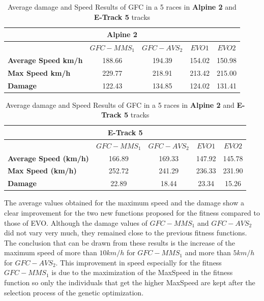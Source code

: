 \documentclass[conference]{IEEEtran}
\begin{document}
\begin{table}[!ht]
  \centering
  {\scriptsize
    \caption{Average damage and Speed Results of GFC in a 5 races in \textbf{Alpine 2} and  \textbf{E-Track 5} tracks}
    \label{tab:damagespeed}
    \begin{tabular}{|p{1.65cm}|c|c|c|c|}
      \hline 
      \multicolumn{5}{|c|}{\textbf{Alpine 2}}  \\	
      \hline  
   & \textbf{$GFC-MMS_1$}&\textbf{$GFC-AVS_2$} & \textbf{$EVO1$} &\textbf{$EVO2$}\\					
      \hline \textbf{Average Speed km/h}& 188.66&194.39&154.02&150.98\\
      \hline \textbf{Max Speed km/h}& 229.77&218.91&213.42&215.00\\	
      \hline \textbf{Damage}& 122.43& 134.85&124.02 &131.41\\	
      \hline 
    \end{tabular}
    \begin{tabular}{|p{1.65cm}|c|c|c|c|}
      \multicolumn{5}{|c|}{\textbf{E-Track 5}}  \\
      \hline 
   & \textbf{$GFC-MMS_1$}&\textbf{$GFC-AVS_2$} & \textbf{$EVO1$} &\textbf{$EVO2$} \\				
      \hline \textbf{Average Speed (km/h)}& 166.89&169.33&147.92&145.78\\
      \hline \textbf{Max Speed  (km/h)}&252.72&241.29&236.33&231.90\\	
      \hline \textbf{Damage}& 22.89& 18.44&23.34 &15.26\\	
      \hline 
    \end{tabular}
	}
\end{table} 

The average values obtained for the maximum speed and the damage show a clear improvement for the two new functions proposed for the fitness compared to those of EVO.
Although the damage values of $GFC-MMS_1$ and $GFC-AVS_2$ did not vary very much, they remained close to the previous fitness functions.
The conclusion that can be drawn from these results is the increase of
the maximum speed of more than $10 km/h$ for $GFC-MMS_1$ and more than
$5 km/h$ for $GFC-AVS_2$. This improvement in speed especially for the
fitness $GFC-MMS_1$ is due to the maximization of the MaxSpeed in the
fitness function so only the individuals that get the higher MaxSpeed
are kept after the selection process of the genetic optimization. 
\end{document}
